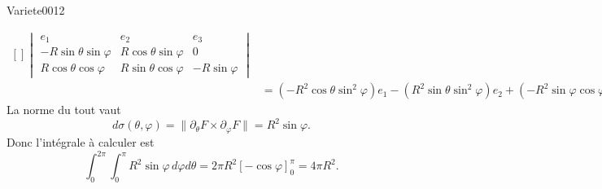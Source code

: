 \begin{corrige}{Variete0012}
\begin{enumerate}
\begin{equation}
\begin{aligned}[]
\begin{vmatrix}
						e_1				&	e_2				&	e_3	\\
						-R\sin\theta\sin\varphi		&	R\cos\theta\sin\varphi		&	0	\\
						R\cos\theta\cos\varphi		&	R\sin\theta\cos\varphi		&	-R\sin\varphi
					\end{vmatrix}\\
					&=(-R^2\cos\theta\sin^2\varphi)e_1-(R^2\sin\theta\sin^2\varphi)e_2+(-R^2\sin\varphi\cos\varphi)e_3.
				\end{aligned}
			\end{equation}
			La norme du tout vaut
			\begin{equation}
				d\sigma(\theta,\varphi)=\| \partial_{\theta}F\times\partial_{\varphi}F \|=R^2\sin\varphi.
			\end{equation}
			Donc l'intégrale à calculer est
			\begin{equation}
				\int_0^{2\pi}\int_0^{\pi}R^2\sin\varphi\,d\varphi d\theta=2\pi R^2[-\cos\varphi]_0^{\pi}=4\pi R^2.
			\end{equation}


\end{enumerate}
\end{corrige}
